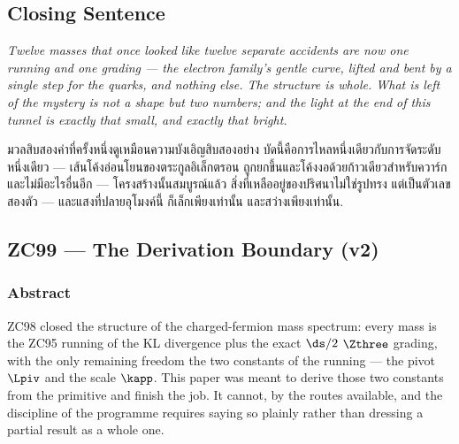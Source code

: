 \documentclass[12pt, a4paper]{article}
\begin{document}
\subsection{Closing Sentence}

\bigskip
\begin{center}
\textit{%
  Twelve masses that once looked like twelve separate accidents are now one
  running and one grading --- the electron family's gentle curve, lifted and
  bent by a single step for the quarks, and nothing else. The structure is whole.
  What is left of the mystery is not a shape but two numbers; and the light at
  the end of this tunnel is exactly that small, and exactly that bright.}

\medskip
{\thaifont
มวลสิบสองค่าที่ครั้งหนึ่งดูเหมือนความบังเอิญสิบสองอย่าง บัดนี้คือการไหลหนึ่งเดียวกับการจัดระดับหนึ่งเดียว ---
เส้นโค้งอ่อนโยนของตระกูลอิเล็กตรอน ถูกยกขึ้นและโค้งงอด้วยก้าวเดียวสำหรับควาร์ก และไม่มีอะไรอื่นอีก ---
โครงสร้างนั้นสมบูรณ์แล้ว สิ่งที่เหลืออยู่ของปริศนาไม่ใช่รูปทรง แต่เป็นตัวเลขสองตัว ---
และแสงที่ปลายอุโมงค์นี้ ก็เล็กเพียงเท่านั้น และสว่างเพียงเท่านั้น.}
\end{center}



\subsection{ZC99 --- The Derivation Boundary (v2)}
\subsubsection*{Abstract}
\sloppy
ZC98 closed the structure of the charged-fermion mass spectrum: every mass is
the ZC95 running of the KL divergence plus the exact $\ds/2$ $\Zthree$ grading,
with the only remaining freedom the two constants of the running --- the pivot
$\Lpiv$ and the scale $\kapp$. This paper was meant to derive those two
constants from the primitive and finish the job. It cannot, by the routes
available, and the discipline of the programme requires saying so plainly rather
than dressing a partial result as a whole one.
\end{document}

